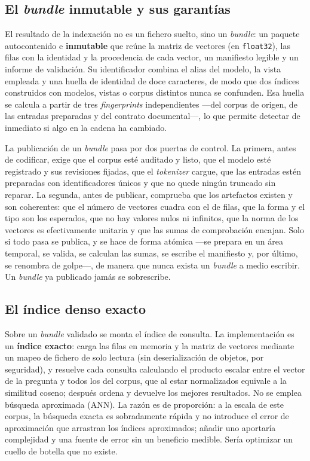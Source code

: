 \subsection{El \emph{bundle} inmutable y sus garantías}
\label{subsec:bundle}

El resultado de la indexación no es un fichero suelto, sino un \emph{bundle}: un paquete autocontenido e \textbf{inmutable} que reúne la matriz de vectores (en \texttt{float32}), las filas con la identidad y la procedencia de cada vector, un manifiesto legible y un informe de validación. Su identificador combina el alias del modelo, la vista empleada y una huella de identidad de doce caracteres, de modo que dos índices construidos con modelos, vistas o corpus distintos nunca se confunden. Esa huella se calcula a partir de tres \emph{fingerprints} independientes —del corpus de origen, de las entradas preparadas y del contrato documental—, lo que permite detectar de inmediato si algo en la cadena ha cambiado.

La publicación de un \emph{bundle} pasa por dos puertas de control. La primera, antes de codificar, exige que el corpus esté auditado y listo, que el modelo esté registrado y sus revisiones fijadas, que el \emph{tokenizer} cargue, que las entradas estén preparadas con identificadores únicos y que no quede ningún truncado sin reparar. La segunda, antes de publicar, comprueba que los artefactos existen y son coherentes: que el número de vectores cuadra con el de filas, que la forma y el tipo son los esperados, que no hay valores nulos ni infinitos, que la norma de los vectores es efectivamente unitaria y que las sumas de comprobación encajan. Solo si todo pasa se publica, y se hace de forma atómica —se prepara en un área temporal, se valida, se calculan las sumas, se escribe el manifiesto y, por último, se renombra de golpe—, de manera que nunca exista un \emph{bundle} a medio escribir. Un \emph{bundle} ya publicado jamás se sobrescribe.

\subsection{El índice denso exacto}
\label{subsec:indice-exacto}

Sobre un \emph{bundle} validado se monta el índice de consulta. La implementación es un \textbf{índice exacto}: carga las filas en memoria y la matriz de vectores mediante un mapeo de fichero de solo lectura (sin deserialización de objetos, por seguridad), y resuelve cada consulta calculando el producto escalar entre el vector de la pregunta y todos los del corpus, que al estar normalizados equivale a la similitud coseno; después ordena y devuelve los mejores resultados. No se emplea búsqueda aproximada (ANN). La razón es de proporción: a la escala de este corpus, la búsqueda exacta es sobradamente rápida y no introduce el error de aproximación que arrastran los índices aproximados; añadir uno aportaría complejidad y una fuente de error sin un beneficio medible. Sería optimizar un cuello de botella que no existe.


